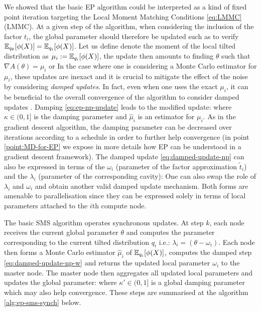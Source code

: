 We showed that the basic EP algorithm could be interpreted as a kind of fixed point iteration targeting the Local Moment Matching Conditions \eqref{eq:LMMC} (LMMC). At a given step of the algorithm, when considering the inclusion of the factor $t_i$, the global parameter should therefore be updated such as to verify $\mathbb E_{q_\theta}[\phi(X)]= \mathbb E_{q_i}[\phi(X)]$. Let us define denote the moment of the local tilted distribution as $\mu_i:=\mathbb E_{q_i}[\phi(X)]$, the update then amounts to finding $\theta$ such that $\nabla A(\theta) = \mu_i$ or
%
%
In the case where one is considering a Monte Carlo estimator for $\mu_i$, these updates are inexact and it is crucial to mitigate the effect of the noise by considering \emph{damped updates}. In fact, even when one uses the exact $\mu_i$, it can be beneficial to the overall convergence of the algorithm to consider damped updates \citep{heskes03}. Damping \eqref{eq:ep-np-update} leads to the modified update:
%
%
where $\kappa \in(0,1]$ is the damping parameter and $\hat\mu_i$ is an estimator for $\mu_i$. As in the gradient descent algorithm, the damping parameter can be decreased over iterations according to a schedule in order to further help convergence (in point \ref{point:MD-for-EP} we expose in more details how EP can be understood in a gradient descent framework).
The damped update \eqref{eq:damped-update-np} can also be expressed in terms of the $\omega_i$ (parameter of the factor approximation $\tilde t_i$) and the $\lambda_i$ (parameter of the corresponding cavity):
%
%
One can also swap the role of $\lambda_i$ and $\omega_i$ and obtain another valid damped update mechanism. Both forms are amenable to parallelisation since they can be expressed solely in terms of local parameters attached to the $i$th compute node.

The basic SMS algorithm operates synchronous updates.
At step $k$, each node receives the current global parameter $\theta$ and computes the parameter corresponding to the current tilted distribution $q_i$ i.e.: $\lambda_i=(\theta-\omega_i)$. Each node then forms a Monte Carlo estimator $\hat\mu_i$ of $\mathbb E_{q_i}[\phi(X)]$, computes the damped step \eqref{eq:damped-update-np-w} and returns the updated local parameter $\omega_i$ to the master node. 
The master node then aggregates all updated local parameters and updates the global parameter: 
%
%
where $\kappa' \in (0,1]$ is a global damping parameter which may also help convergence. 
These steps are summarised at the algorithm \ref{alg:ep-sms-synch} below.

